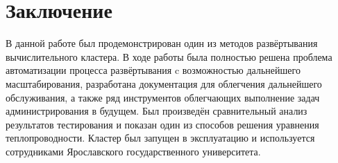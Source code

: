 \documentclass[a4paper]{extarticle}
\begin{document}
\newpage

\section*{Заключение}
В данной работе был продемонстрирован один из методов развёртывания вычислительного кластера.
В ходе работы была полностью решена проблема автоматизации процесса развёртывания c возможностью дальнейшего масштабирования, разработана документация для облегчения дальнейшего обслуживания, а  также ряд инструментов облегчающих выполнение задач администрирования в будущем.  Был произведён сравнительный анализ результатов тестирования и показан один из способов решения уравнения теплопроводности. Кластер был запущен в эксплуатацию и используется сотрудниками Ярославского государственного университета.

\newpage

\end{document}

